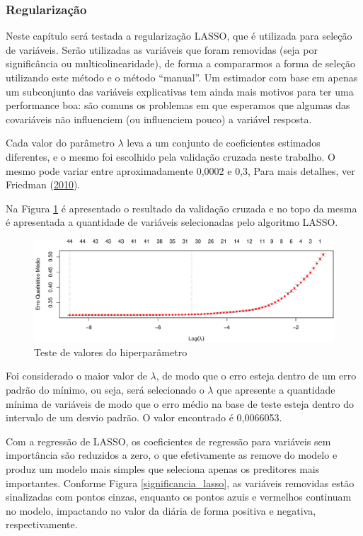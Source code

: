 \documentclass[
	12pt,				%
	a4paper,		%
	oneside,    %
	chapter=TITLE,		   %
	section=TITLE,		   %
	subsection=TITLE,	   %
	subsubsection=TITLE, %
	english,			%
	french,				%
	spanish,			%
	brazil,				%
]{abntex2}
\begin{document}
\hypertarget{regularizauxe7uxe3o-1}{%
\subsubsection{Regularização}\label{regularizauxe7uxe3o-1}}

Neste capítulo será testada a regularização LASSO, que é utilizada para
seleção de variáveis. Serão utilizadas as variáveis que foram removidas
(seja por significância ou multicolinearidade), de forma a compararmos a
forma de seleção utilizando este método e o método ``manual''. Um
estimador com base em apenas um subconjunto das variáveis explicativas
tem ainda mais motivos para ter uma performance boa: são comuns os
problemas em que esperamos que algumas das covariáveis não influenciem
(ou influenciem pouco) a variável resposta.

Cada valor do parâmetro \(\lambda\) leva a um conjunto de coeficientes
estimados diferentes, e o mesmo foi escolhido pela validação cruzada
neste trabalho. O mesmo pode variar entre aproximadamente 0,0002 e 0,3,
Para mais detalhes, ver Friedman
(\protect\hyperlink{ref-friedman2010regularization}{2010}).

Na Figura \ref{lasso_lambda} é apresentado o resultado da validação
cruzada e no topo da mesma é apresentada a quantidade de variáveis
selecionadas pelo algoritmo LASSO.

\begin{figure}
\centering
\includegraphics{00-TCC_files/figure-latex/lasso_lambda-1.pdf}
\caption{\label{lasso_lambda}Teste de valores do hiperparâmetro}
\end{figure}

Foi considerado o maior valor de \(\lambda\), de modo que o erro esteja
dentro de um erro padrão do mínimo, ou seja, será selecionado o
\(\lambda\) que apresente a quantidade mínima de variáveis de modo que o
erro médio na base de teste esteja dentro do intervalo de um desvio
padrão. O valor encontrado é 0,0066053.

Com a regressão de LASSO, os coeficientes de regressão para variáveis
sem importância são reduzidos a zero, o que efetivamente as remove do
modelo e produz um modelo mais simples que seleciona apenas os
preditores mais importantes. Conforme Figura \ref{significancia_lasso},
as variáveis removidas estão sinalizadas com pontos cinzas, enquanto os
pontos azuis e vermelhos continuam no modelo, impactando no valor da
diária de forma positiva e negativa, respectivamente.
\end{document}
